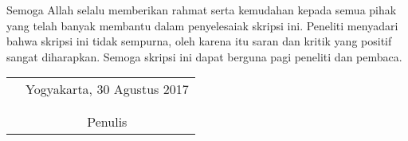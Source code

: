 Semoga Allah selalu memberikan rahmat serta kemudahan kepada semua pihak yang telah banyak membantu dalam penyelesaiak skripsi ini. Peneliti menyadari bahwa skripsi ini tidak sempurna, oleh karena itu saran dan kritik yang positif sangat diharapkan. Semoga skripsi ini dapat berguna pagi peneliti dan pembaca.

\vspace{1.5cm}
\begin{tabular}{p{7.5cm}c}
&Yogyakarta, 30 Agustus 2017\\
&\\
&\\
&Penulis
\end{tabular}
\vfill